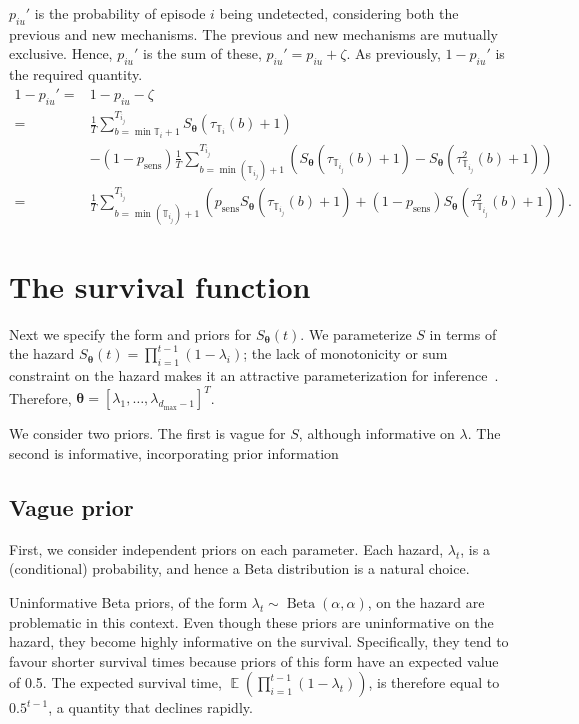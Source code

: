 \documentclass[12pt]{article}
\def\dist{\sim}
\DeclareMathOperator{\E}{\mathbb{E}}
\DeclareMathOperator{\BetaDist}{Beta}
\renewcommand{\vec}[1]{\bm{#1}}
\newcommand{\dmax}{d_\text{max}}
\newcommand{\sched}{\mathbb{T}}
\begin{document}
$p_{iu}'$ is the probability of episode $i$ being undetected, considering both the previous and new mechanisms.
The previous and new mechanisms are mutually exclusive.
Hence, $p_{iu}'$ is the sum of these, $p_{iu}' = p_{iu} + \zeta$.
As previously, $1 - p_{iu}'$ is the required quantity.
\begin{align}
1 - p_{iu}'
=& 1 - p_{iu} - \zeta \\
=& \frac{1}{T} \sum_{b = \min \sched_{i} + 1}^{T_{i_j}} S_{\vec{\theta}}(\tau_{\sched_{i}}(b) + 1) \\
&- (1 - p_\text{sens})\frac{1}{T} \sum_{b=\min(\sched_{i_j}) + 1}^{T_{i_j}} \left( S_{\vec{\theta}}(\tau_{\sched_{i_j}}(b) + 1) - S_{\vec{\theta}}(\tau^2_{\sched_{i_j}}(b) + 1) \right) \\
=& \frac{1}{T} \sum_{b=\min(\sched_{i_j}) + 1}^{T_{i_j}} \left( p_\text{sens} S_{\vec{\theta}}(\tau_{\sched_{i_j}}(b) + 1) + (1 - p_\text{sens}) S_{\vec{\theta}}(\tau^2_{\sched_{i_j}}(b) + 1)\right).
\label{imperf-test:eq:pit-prime}
\end{align}


\section{The survival function} \label{sec:parameters-priors}

Next we specify the form and priors for $S_{\vec{\theta}}(t)$.
We parameterize $S$ in terms of the hazard $S_{\vec{\theta}}(t) = \prod_{i=1}^{t-1} (1 - \lambda_{i})$; the lack of monotonicity or sum constraint on the hazard makes it an attractive parameterization for inference~\citep{heBayesian}.
Therefore, $\vec{\theta} = [\lambda_1, \dots, \lambda_{\dmax-1}]^T$.

We consider two priors.
The first is vague for $S$, although informative on $\lambda$.
The second is informative, incorporating prior information

\subsection{Vague prior} \label{sec:vague-prior}

First, we consider independent priors on each parameter.
Each hazard, $\lambda_t$, is a (conditional) probability, and hence a Beta distribution is a natural choice.

Uninformative Beta priors, of the form $\lambda_t \dist \BetaDist(\alpha, \alpha)$, on the hazard are problematic in this context.
Even though these priors are uninformative on the hazard, they become highly informative on the survival. 
Specifically, they tend to favour shorter survival times because priors of this form have an expected value of 0.5.
The expected survival time, $\E \left( \prod_{i=1}^{t-1} (1-\lambda_t) \right)$, is therefore equal to $0.5^{t-1}$, a quantity that declines rapidly.
\end{document}
